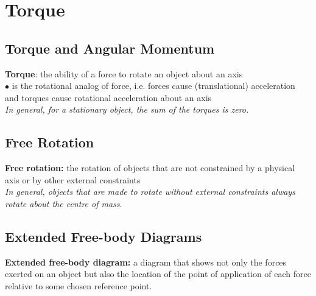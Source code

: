 \section{Torque}

    \subsection{Torque and Angular Momentum}

        \textbf{Torque}: the ability of a force to rotate an object about an axis \\
        $\bullet$ is the rotational analog of force, i.e. forces cause (translational) acceleration and torques cause rotational acceleration about an axis \\

        \textit{In general, for a stationary object, the sum of the torques is zero.}

    \subsection{Free Rotation}

        \textbf{Free rotation:} the rotation of objects that are not constrained by a physical axis or by other external constraints \\

        \textit{In general, objects that are made to rotate without external constraints always rotate about the centre of mass}.

    \subsection{Extended Free-body Diagrams}

        \textbf{Extended free-body diagram:} a diagram that shows not only the forces exerted on an object but also the location of the point of application of each force relative to some chosen reference point.